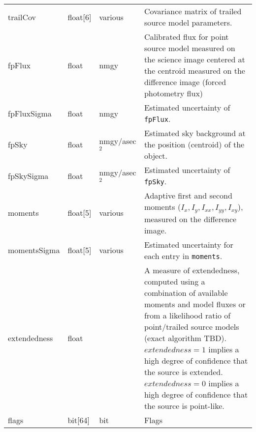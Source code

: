 \documentclass[12pt]{article}
\begin{document}
\begin{center}
\begin{longtable}{p{3cm}p{2cm}p{2cm}p{5cm}}
trailCov & float[6] & various & Covariance matrix of trailed source model parameters. \\ 

fpFlux & float & nmgy & Calibrated flux for point source model measured on the science image centered at the centroid measured on the difference image (forced photometry flux) \\ 

fpFluxSigma & float & nmgy & Estimated uncertainty of \texttt{fpFlux}. \\ 

fpSky & float & nmgy/asec$^{2}$ & Estimated sky background at the position (centroid) of the object. \\ 

fpSkySigma & float & nmgy/asec$^{2}$ & Estimated uncertainty of \texttt{fpSky}. \\ 



moments & float[5] & various & Adaptive first and second moments ($I_{x}, I_{y}, I_{xx}, I_{yy}, I_{xy}$), measured on the difference image. \\ 

momentsSigma & float[5] & various & Estimated uncertainty for each entry in \texttt{moments}. \\ 

extendedness & float & ~ & A measure of extendedness, computed using a combination of available moments and model fluxes or from a likelihood ratio of point/trailed source models (exact algorithm TBD). $extendedness=1$ implies a high degree of confidence that the source is extended. $extendedness=0$ implies a high degree of confidence that the source is point-like. \\

flags & bit[64] & bit & Flags \\ \hline
\end{longtable}
\end{center}
\end{document}
